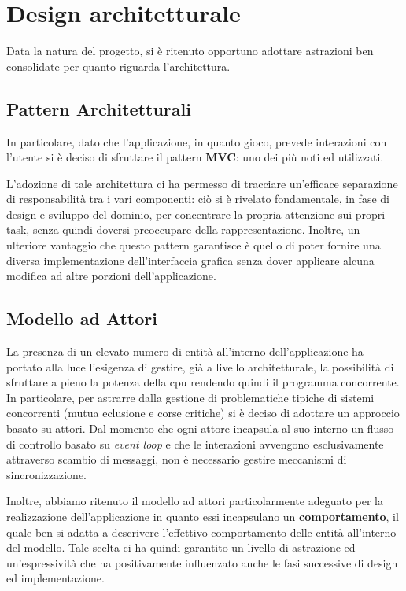 \section{Design architetturale}\label{sec:architectural-design}
Data la natura del progetto, si è ritenuto opportuno adottare astrazioni ben consolidate per quanto riguarda
l'architettura.

\subsection{Pattern Architetturali}
In particolare, dato che l'applicazione, in quanto gioco, prevede interazioni con l'utente si è deciso
di sfruttare il pattern \textbf{MVC}: uno dei più noti ed utilizzati.

L'adozione di tale architettura ci ha permesso di tracciare un'efficace separazione di responsabilità
tra i vari componenti:
ciò si è rivelato fondamentale, in fase di design e sviluppo del dominio, per concentrare la propria attenzione
sui propri task, senza quindi doversi preoccupare della rappresentazione.
Inoltre, un ulteriore vantaggio che questo pattern garantisce è quello di poter fornire una diversa
implementazione dell'interfaccia grafica senza dover applicare alcuna modifica ad altre porzioni dell'applicazione.

\subsection{Modello ad Attori}
La presenza di un elevato numero di entità all'interno dell'applicazione ha portato alla luce l'esigenza di gestire,
già a livello architetturale, la possibilità di sfruttare a pieno la potenza della cpu rendendo quindi il programma
concorrente. In particolare, per astrarre dalla gestione di problematiche tipiche di sistemi concorrenti
(mutua eclusione e corse critiche) si è deciso di adottare un approccio basato su attori. Dal momento che ogni attore
incapsula al suo interno un flusso di controllo basato su \textit{event loop} e che le interazioni avvengono
esclusivamente attraverso scambio di messaggi, non è necessario gestire meccanismi di sincronizzazione.

Inoltre, abbiamo ritenuto il modello ad attori particolarmente adeguato per la realizzazione dell'applicazione
in quanto essi incapsulano un \textbf{comportamento}, il quale ben si adatta a descrivere l'effettivo comportamento
delle entità all'interno del modello. Tale scelta ci ha quindi garantito un livello di astrazione ed un'espressività
che ha positivamente influenzato anche le fasi successive di design ed implementazione.

